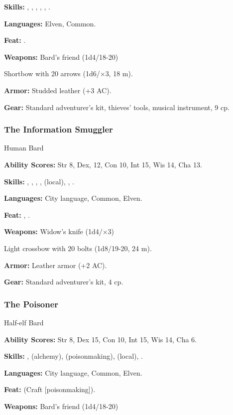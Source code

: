 \textbf{Skills:} , , , , , .

\textbf{Languages:} Elven, Common.

\textbf{Feat:} .

\textbf{Weapons:} Bard's friend (1d4/18-20)

Shortbow with 20 arrows (1d6/$\times$3, 18 m).

\textbf{Armor:} Studded leather (+3 AC).

\textbf{Gear:} Standard adventurer's kit, thieves' tools, musical instrument, 9 cp.

\subsubsection{The Information Smuggler}
Human Bard

\textbf{Ability Scores:} Str 8, Dex, 12, Con 10, Int 15, Wis 14, Cha 13.

\textbf{Skills:} , , , ,  (local), , .

\textbf{Languages:} City language, Common, Elven.

\textbf{Feat:} , .

\textbf{Weapons:} Widow's knife (1d4/$\times$3)

Light crossbow with 20 bolts (1d8/19-20, 24 m).

\textbf{Armor:} Leather armor (+2 AC).

\textbf{Gear:} Standard adventurer's kit, 4 cp.

\subsubsection{The Poisoner}
Half-elf Bard

\textbf{Ability Scores:} Str 8, Dex 15, Con 10, Int 15, Wis 14, Cha 6.

\textbf{Skills:} ,  (alchemy),  (poisonmaking),  (local), .

\textbf{Languages:} City language, Common, Elven.

\textbf{Feat:}  (Craft [poisonmaking]).

\textbf{Weapons:} Bard's friend (1d4/18-20)

